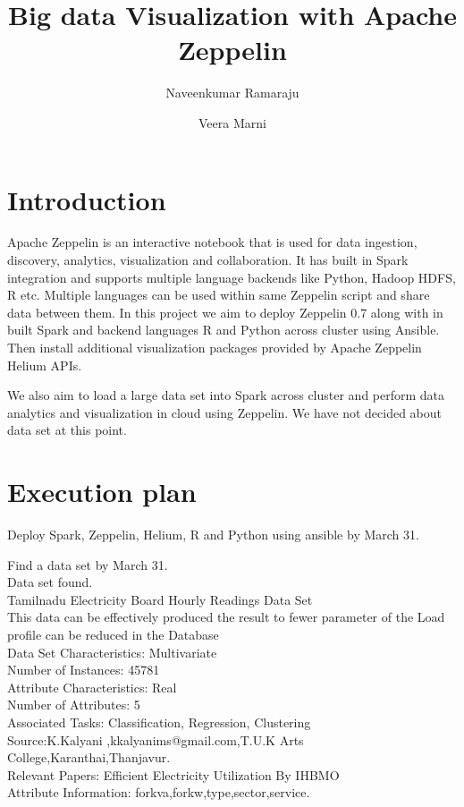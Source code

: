 \documentclass[9pt,twocolumn,twoside]{../../styles/osajnl}
\title{Big data Visualization with Apache Zeppelin}
\author[1, *]{Naveenkumar Ramaraju}
\author[1,*]{Veera Marni}
\affil[1]{School of Informatics and Computing, Bloomington, IN 47408, U.S.A.}
\affil[*]{Corresponding authors: naveenkumar2703@gmail.com, narayana1043@gmail.com}
\begin{document}
\maketitle

\section{Introduction}

Apache Zeppelin\cite{www-zeppelin}  is an interactive notebook that is used for data ingestion, discovery, analytics, visualization and collaboration. It has built in Spark integration and supports multiple language backends like Python, Hadoop HDFS, R etc.  Multiple languages can be used within same Zeppelin script and share data between them. In this project we aim to deploy Zeppelin 0.7 along with in built Spark and backend languages R and Python across cluster using Ansible. Then install additional  visualization packages provided by Apache Zeppelin Helium APIs. 

We also aim to load a large data set into Spark across cluster and perform data analytics and visualization in cloud using Zeppelin. We have not decided about data set at this point.

\section{Execution plan}

Deploy Spark, Zeppelin, Helium, R and Python using ansible by March 31.

Find a  data set by March 31. \\

Data set found. \\

Tamilnadu Electricity Board Hourly Readings Data Set \\

This data can be effectively produced the result to fewer parameter 
of the Load profile can be reduced in the Database \\

Data Set Characteristics:  Multivariate \\
Number of Instances: 45781 \\
Attribute Characteristics: Real \\
Number of Attributes: 5 \\
Associated Tasks: Classification, Regression, Clustering \\
Source:K.Kalyani ,kkalyanims@gmail.com,T.U.K Arts  \\
College,Karanthai,Thanjavur. \\
Relevant Papers: Efficient Electricity Utilization By IHBMO \\
Attribute Information: forkva,forkw,type,sector,service. \\
\end{document}
